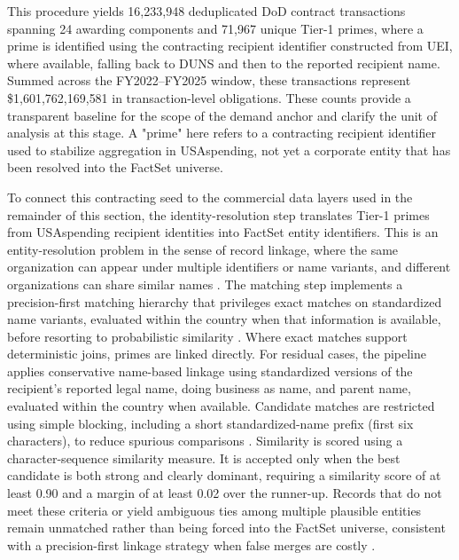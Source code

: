 This procedure yields 16{,}233{,}948 deduplicated DoD contract transactions spanning 24 awarding components and 71{,}967 unique Tier-1 primes, where a prime is identified using the contracting recipient identifier constructed from UEI, where available, falling back to DUNS and then to the reported recipient name. Summed across the FY2022--FY2025 window, these transactions represent \$1{,}601{,}762{,}169{,}581 in transaction-level obligations. These counts provide a transparent baseline for the scope of the demand anchor and clarify the unit of analysis at this stage. A "prime" here refers to a contracting recipient identifier used to stabilize aggregation in USAspending, not yet a corporate entity that has been resolved into the FactSet universe.

To connect this contracting seed to the commercial data layers used in the remainder of this section, the identity-resolution step translates Tier-1 primes from USAspending recipient identities into FactSet entity identifiers. This is an entity-resolution problem in the sense of record linkage, where the same organization can appear under multiple identifiers or name variants, and different organizations can share similar names \parencite{fellegi_theory_1969,christen_data_2012}. The matching step implements a precision-first matching hierarchy that privileges exact matches on standardized name variants, evaluated within the country when that information is available, before resorting to probabilistic similarity \parencite{christen_data_2012,winkler_overview_2006}. Where exact matches support deterministic joins, primes are linked directly. For residual cases, the pipeline applies conservative name-based linkage using standardized versions of the recipient's reported legal name, doing business as name, and parent name, evaluated within the country when available. Candidate matches are restricted using simple blocking, including a short standardized-name prefix (first six characters), to reduce spurious comparisons \parencite{christen_data_2012,winkler_overview_2006}. Similarity is scored using a character-sequence similarity measure. It is accepted only when the best candidate is both strong and clearly dominant, requiring a similarity score of at least 0.90 and a margin of at least 0.02 over the runner-up. Records that do not meet these criteria or yield ambiguous ties among multiple plausible entities remain unmatched rather than being forced into the FactSet universe, consistent with a precision-first linkage strategy when false merges are costly \parencite{fellegi_theory_1969}.

